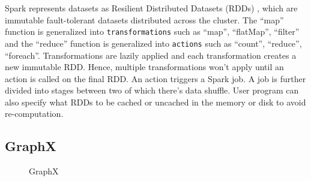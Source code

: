 Spark represents datasets as Resilient Distributed Datasets (RDDs)
, which are immutable fault-tolerant
datasets distributed across the cluster. The ``map'' function is generalized
into {\tt transformations} such as ``map'', ``flatMap'', ``filter'' and the
``reduce'' function is generalized into {\tt actions} such as ``count'',
``reduce'', ``foreach''. Transformations are lazily applied and each
transformation creates a new immutable RDD.  Hence, multiple transformations
won't apply until an action is called on the final RDD. An action triggers a
Spark job. A job is further divided into stages between two of which there's
data shuffle. User program can also specify what RDDs to be cached or uncached
in the memory or disk to avoid re-computation.

\subsection{GraphX}

\begin{figure}[h]
	\centering
	\caption{GraphX}
\end{figure}

